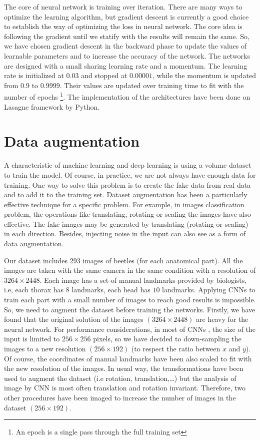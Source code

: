 The core of neural network is training over iteration. There are many ways to optimize the learning algorithm, but gradient descent \cite{} is currently a good choice to establish the way of optimizing the loss in neural network. The core idea is following the gradient until we statify with the results will remain the same. So, we have chosen gradient descent in the backward phase to update the values of learnable parameters and to increase the accuracy of the network. The networks are designed with a small sharing learning rate and a momentum. The learning rate is initialized at $0.03$ and stopped at $0.00001$, while the momentum is updated from $0.9$ to $0.9999$. Their values are updated over training time to fit with the number of epochs \footnote{An epoch is a single pass through the full training set}. The implementation of the architectures have been done on Lasagne framework \cite{} by Python. 

\section{Data augmentation}
A characteristic of machine learning and deep learning is using a volume dataset to train the model. Of course, in practice, we are not always have enough data for training. One way to solve this problem is to create the fake data from real data and to add it to the training set. Dataset augmentation has been a particularly effective technique for a specific problem. For example, in images classification problem, the operations like translating,  rotating or scaling the images have also effective. The fake images may be generated by translating (rotating or scaling) in each direction. Besides, injecting noise in the input can also see as a form of data augmentation.

Our dataset includes $293$ images of beetles (for each anatomical part). All the images are taken with the same camera in the same condition with a resolution of $3264 \times 2448$. Each image has a set of manual landmarks provided by biologists, i.e, each thorax has $8$ landmarks, each head has $10$ landmarks. Applying CNNs to train each part with a small number of images to reach good results is impossible. So, we need to augment the dataset before training the networks. Firstly, we have found that the original solution of the images $(3264 \times 2448)$ are heavy for the neural network. For performance considerations, in most of CNNs \cite{}, the size of the input is limited to $256 \times 256$ pixels, so we have decided to down-sampling the images to a new resolution $(256 \times 192)$ (to respect the ratio between $x$ and $y$). Of course, the coordinates of manual landmarks have been also scaled to fit with the new resolution of the images. In usual way, the transformations have been used to augment the dataset (i.e rotation, translation,\ldots) but the analysis of image by CNN is most often translation and rotation invariant. Therefore, two other procedures have been imaged to increase the number of images in the dataset $(256 \times 192)$.


